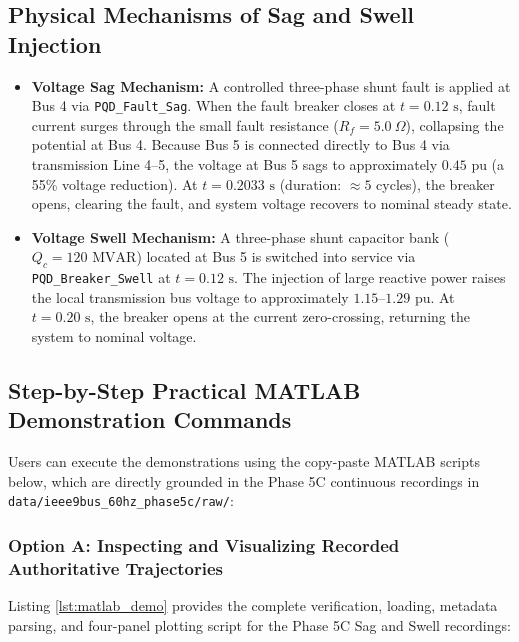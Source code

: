 \documentclass[12pt,a4paper]{report}
\begin{document}
\subsection{Physical Mechanisms of Sag and Swell Injection}
\begin{itemize}
    \item \textbf{Voltage Sag Mechanism:} A controlled three-phase shunt fault is applied at Bus 4 via \texttt{PQD\_Fault\_Sag}. When the fault breaker closes at $t = 0.12\text{ s}$, fault current surges through the small fault resistance ($R_f = 5.0\ \Omega$), collapsing the potential at Bus 4. Because Bus 5 is connected directly to Bus 4 via transmission Line 4--5, the voltage at Bus 5 sags to approximately $0.45\text{ pu}$ (a 55\% voltage reduction). At $t = 0.2033\text{ s}$ (duration: $\approx 5$ cycles), the breaker opens, clearing the fault, and system voltage recovers to nominal steady state.
    \item \textbf{Voltage Swell Mechanism:} A three-phase shunt capacitor bank ($Q_c = 120\text{ MVAR}$) located at Bus 5 is switched into service via \texttt{PQD\_Breaker\_Swell} at $t = 0.12\text{ s}$. The injection of large reactive power raises the local transmission bus voltage to approximately $1.15\text{--}1.29\text{ pu}$. At $t = 0.20\text{ s}$, the breaker opens at the current zero-crossing, returning the system to nominal voltage.
\end{itemize}

\subsection{Step-by-Step Practical MATLAB Demonstration Commands}
Users can execute the demonstrations using the copy-paste MATLAB scripts below, which are directly grounded in the Phase 5C continuous recordings in \texttt{data/ieee9bus\_60hz\_phase5c/raw/}:

\subsubsection{Option A: Inspecting and Visualizing Recorded Authoritative Trajectories}
Listing \ref{lst:matlab_demo} provides the complete verification, loading, metadata parsing, and four-panel plotting script for the Phase 5C Sag and Swell recordings:
\end{document}
